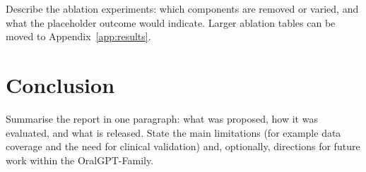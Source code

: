 Describe the ablation experiments: which components are removed or varied,
and what the placeholder outcome would indicate. Larger ablation tables can be
moved to Appendix~\ref{app:results}.

\section{Conclusion}

Summarise the report in one paragraph: what was proposed, how it was
evaluated, and what is released. State the main limitations (for example data
coverage and the need for clinical validation) and, optionally, directions for
future work within the OralGPT-Family.



